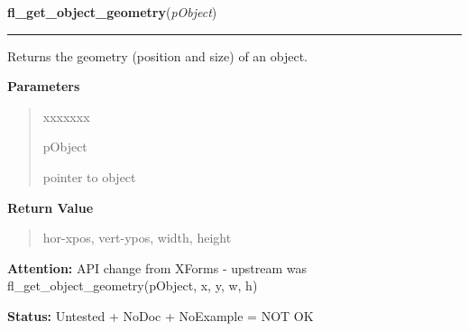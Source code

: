 \hspace{.8\funcindent}\begin{boxedminipage}{\funcwidth}

    \raggedright \textbf{fl\_get\_object\_geometry}(\textit{pObject})

    \vspace{-1.5ex}

    \rule{\textwidth}{0.5\fboxrule}
\setlength{\parskip}{2ex}
    Returns the geometry (position and size) of an object.

\setlength{\parskip}{1ex}
      \textbf{Parameters}
      \vspace{-1ex}

      \begin{quote}
        \begin{Ventry}{xxxxxxx}

          \item[pObject]

          pointer to object

        \end{Ventry}

      \end{quote}

      \textbf{Return Value}
    \vspace{-1ex}

      \begin{quote}
      hor-xpos, vert-ypos, width, height

      \end{quote}

\textbf{Attention:} API change from XForms - upstream was fl\_get\_object\_geometry(pObject, x,
y, w, h)



\textbf{Status:} Untested + NoDoc + NoExample = NOT OK



    \end{boxedminipage}

    \label{xformslib:library:fl_get_object_position}

    \vspace{0.5ex}

